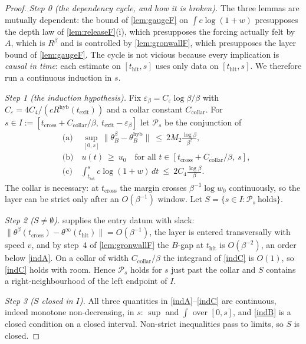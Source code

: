 \documentclass[11pt]{article}
\theoremstyle{definition}
\theoremstyle{remark}
\newcommand{\thit}{t_{\mathrm{hit}}}
\newcommand{\texit}{t_{\mathrm{exit}}}
\newcommand{\hyb}{\mathrm{hyb}}
\newcommand{\tcross}{t_{\mathrm{cross}}}
\begin{document}
\begin{proof}
\emph{Step 0 (the dependency cycle, and how it is broken).} The three lemmas are
mutually dependent: the bound of \cref{lem:gaugeF} on $\int c\log(1+w)$
presupposes the depth law of \cref{lem:releaseF}(i), which presupposes the
forcing actually felt by $A$, which is $R^\beta$ and is controlled by
\cref{lem:gronwallF}, which presupposes the layer bound of \cref{lem:gaugeF}.
The cycle is not vicious because every implication is \emph{causal in time}:
each estimate on $[\thit,s]$ uses only data on $[\thit,s]$. We therefore run a
continuous induction in $s$.

\emph{Step 1 (the induction hypothesis).} Fix
$\varepsilon_\beta=C_\varepsilon\log\beta/\beta$ with
$C_\varepsilon=4C_4/(cR^{\hyb}(\texit))$ and a collar constant
$C_{\mathrm{collar}}$. For
$s\in I:=[\tcross+C_{\mathrm{collar}}/\beta,\ \texit-\varepsilon_\beta]$ let
$\mathcal P_s$ be the conjunction of
\begin{align}
&\text{(a)}\quad \sup_{[0,s]}\|\theta_B^\beta-\theta_B^{\hyb}\|
\ \le\ 2M_2\frac{\log\beta}{\beta^2},
\tag{a}\label{indA}\\
&\text{(b)}\quad u(t)\ \ge\ u_0\quad\text{for all }
t\in[\tcross+C_{\mathrm{collar}}/\beta,\ s],
\tag{b}\label{indB}\\
&\text{(c)}\quad \int_{\thit}^{s}c\log(1+w)\,dt\ \le\ 2C_4\frac{\log\beta}{\beta}.
\tag{c}\label{indC}
\end{align}
The collar is necessary: at $\tcross$ the margin crosses $\beta^{-1}\log w_0$
continuously, so the layer can be strict only after an $O(\beta^{-1})$ window.
Let $S=\{s\in I:\mathcal P_s\ \text{holds}\}$.

\emph{Step 2 ($S\neq\emptyset$).}  supplies the entry datum
with slack: $\|\theta^\beta(\tcross)-\theta^\infty(\thit)\|=O(\beta^{-1})$, the
layer is entered transversally with speed $v$, and by step~4 of
\cref{lem:gronwallF} the $B$-gap at $\thit$ is $O(\beta^{-2})$, an order below
\eqref{indA}. On a collar of width $C_{\mathrm{collar}}/\beta$ the integrand of
\eqref{indC} is $O(1)$, so \eqref{indC} holds with room. Hence $\mathcal P_s$
holds for $s$ just past the collar and $S$ contains a right-neighbourhood of the
left endpoint of $I$.

\emph{Step 3 ($S$ closed in $I$).} All three quantities in
\eqref{indA}--\eqref{indC} are continuous, indeed monotone non-decreasing, in
$s$: $\sup$ and $\int$ over $[0,s]$, and \eqref{indB} is a closed condition on a
closed interval. Non-strict inequalities pass to limits, so $S$ is closed.


\end{proof}
\end{document}
